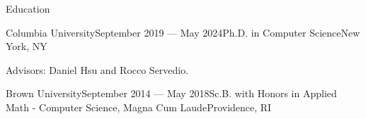 \documentclass{resume} %
\begin{document}
\begin{rSection}{Education}
\begin{rSubsection}{Columbia University}{September 2019 --- May 2024}{Ph.D. in Computer Science}{New York, NY}
\item Advisors: Daniel Hsu and Rocco Servedio.
\end{rSubsection}

\begin{rSubsection}{Brown University}{September 2014 --- May 2018}{Sc.B. with Honors in Applied Math - Computer Science, Magna Cum Laude}{Providence, RI}{}{}
\end{rSubsection}


\end{rSection}




\end{document}
